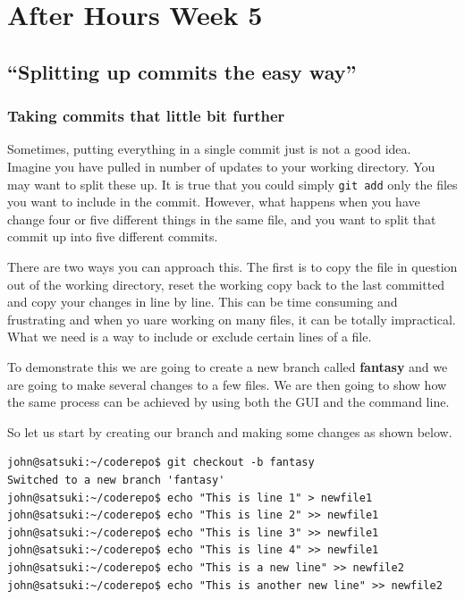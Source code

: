 \chapter{After Hours Week 5}
\section{``Splitting up commits the easy way''}
\subsection{Taking commits that little bit further}

Sometimes, putting everything in a single commit just is not a good idea.
Imagine you have pulled in number of updates to your working directory.
You may want to split these up.
It is true that you could simply \texttt{git add} only the files you want to include in the commit.
However, what happens when you have change four or five different things in the same file, and you want to split that commit up into five different commits.

There are two ways you can approach this.
The first is to copy the file in question out of the working directory, reset the working copy back to the last committed and copy your changes in line by line.
This can be time consuming and frustrating and when yo uare working on many files, it can be totally impractical.
What we need is a way to include or exclude certain lines of a file.

To demonstrate this we are going to create a new branch called \textbf{fantasy} and we are going to make several changes to a few files.
We are then going to show how the same process can be achieved by using both the GUI and the command line.

So let us start by creating our branch and making some changes as shown below.

\begin{Verbatim}
john@satsuki:~/coderepo$ git checkout -b fantasy
Switched to a new branch 'fantasy'
john@satsuki:~/coderepo$ echo "This is line 1" > newfile1
john@satsuki:~/coderepo$ echo "This is line 2" >> newfile1
john@satsuki:~/coderepo$ echo "This is line 3" >> newfile1
john@satsuki:~/coderepo$ echo "This is line 4" >> newfile1
john@satsuki:~/coderepo$ echo "This is a new line" >> newfile2
john@satsuki:~/coderepo$ echo "This is another new line" >> newfile2
\end{Verbatim}

